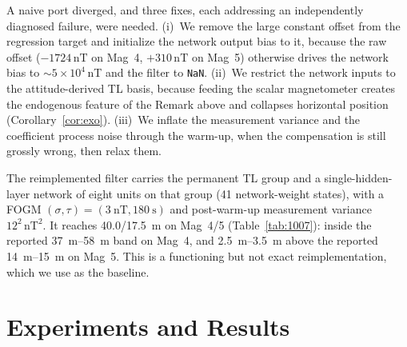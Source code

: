 \documentclass{IEEEtaes}
\begin{document}
A naive port diverged, and three fixes, each addressing an independently diagnosed
failure, were needed. (i)~We remove the large constant offset from the regression
target and initialize the network output bias to it, because the raw offset
($-1724\,\mathrm{nT}$ on Mag~4, $+310\,\mathrm{nT}$ on Mag~5) otherwise drives the
network bias to $\sim\!5\times10^{4}$\,nT and the filter to \texttt{NaN}. (ii)~We
restrict the network inputs to the attitude-derived TL basis, because feeding the
scalar magnetometer creates the endogenous feature of the Remark above and collapses
horizontal position (Corollary~\ref{cor:exo}). (iii)~We inflate the measurement
variance and the coefficient process noise through the warm-up, when the
compensation is still grossly wrong, then relax them.

The reimplemented filter carries the permanent TL group and a single-hidden-layer
network of eight units on that group (\num{41} network-weight states), with a FOGM
$(\sigma,\tau)=(\SI{3}{\nano\tesla},\SI{180}{\second})$ and post-warm-up measurement
variance $12^2\,\mathrm{nT}^2$. It reaches \num{40.0}/\SI{17.5}{\meter} on Mag~4/5
(Table~\ref{tab:1007}): inside the reported \SIrange{37}{58}{\meter} band on Mag~4,
and \SIrange{2.5}{3.5}{\meter} above the reported \SIrange{14}{15}{\meter} on Mag~5.
This is a functioning but not exact reimplementation, which we use as the baseline.

\section{Experiments and Results}\label{sec:results}
\end{document}
